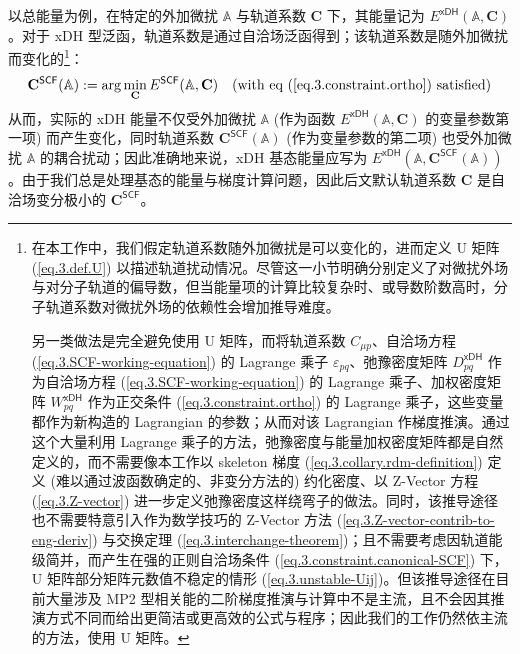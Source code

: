 以总能量为例，在\textsf{特定的}外加微扰 $\mathbb{A}$ 与轨道系数 $\mathbf{C}$ 下，其能量记为 $E^\textsf{xDH} (\mathbb{A}, \mathbf{C})$。对于 xDH 型泛函，轨道系数是通过自洽场泛函得到；该轨道系数是随外加微扰而变化的\footnote{在本工作中，我们假定轨道系数随外加微扰是可以变化的，进而定义 U 矩阵 (\ref{eq.3.def.U}) 以描述轨道扰动情况\cite{Handy-Schaefer.JCP.1984}。尽管这一小节明确分别定义了对微扰外场与对分子轨道的偏导数，但当能量项的计算比较复杂时、或导数阶数高时，分子轨道系数对微扰外场的依赖性会增加推导难度。

另一类做法是完全避免使用 U 矩阵，而将轨道系数 $C_{\mu p}$、自洽场方程 (\ref{eq.3.SCF-working-equation}) 的 Lagrange 乘子 $\varepsilon_{pq}$、弛豫密度矩阵 $D_{pq}^\textsf{xDH}$ 作为自洽场方程 (\ref{eq.3.SCF-working-equation}) 的 Lagrange 乘子、加权密度矩阵 $W_{pq}^\textsf{xDH}$ 作为正交条件 (\ref{eq.3.constraint.ortho}) 的 Lagrange 乘子，这些变量都作为新构造的 Lagrangian 的参数；从而对该 Lagrangian 作梯度推演\cite{Helgaker-Joergensen.TCA.1989, Burow-Eshuis.JCTC.2014}。通过这个大量利用 Lagrange 乘子的方法，弛豫密度与能量加权密度矩阵都是自然定义的，而不需要像本工作以 skeleton 梯度 (\ref{eq.3.collary.rdm-definition}) 定义 (难以通过波函数确定的、非变分方法的) 约化密度、以 Z-Vector 方程 (\ref{eq.3.Z-vector}) 进一步定义弛豫密度这样绕弯子的做法。同时，该推导途径也不需要特意引入作为数学技巧的 Z-Vector 方法 (\ref{eq.3.Z-vector-contrib-to-eng-deriv}) 与交换定理 (\ref{eq.3.interchange-theorem})；且不需要考虑因轨道能级简并，而产生在强的正则自洽场条件 (\ref{eq.3.constraint.canonical-SCF}) 下，U 矩阵部分矩阵元数值不稳定的情形 (\ref{eq.3.unstable-Uij})。但该推导途径在目前大量涉及 MP2 型相关能的二阶梯度推演与计算中不是主流，且不会因其推演方式不同而给出更简洁或更高效的公式与程序；因此我们的工作仍然依主流的方法，使用 U 矩阵。\label{footnote.full-lagrangian}}：
\begin{equation*}
  \mathbf{C}^\textsf{SCF} (\mathbb{A}) := \arg \min_\mathbf{C} E^\textsf{SCF} (\mathbb{A}, \mathbf{C}) \quad \text{(with eq (\ref{eq.3.constraint.ortho}) satisfied)}
\end{equation*}
从而，实际的 xDH 能量不仅受外加微扰 $\mathbb{A}$ (作为函数 $E^\textsf{xDH} (\mathbb{A}, \mathbf{C})$ 的变量参数第一项) 而产生变化，同时轨道系数 $\mathbf{C}^\textsf{SCF} (\mathbb{A})$ (作为变量参数的第二项) 也受外加微扰 $\mathbb{A}$ 的耦合扰动；因此准确地来说，xDH \textsf{基态能量}应写为 $E^\textsf{xDH} (\mathbb{A}, \mathbf{C}^\textsf{SCF} (\mathbb{A}))$。由于我们总是处理基态的能量与梯度计算问题，因此后文默认轨道系数 $\mathbf{C}$ 是自洽场变分极小的 $\mathbf{C}^\textsf{SCF}$。

